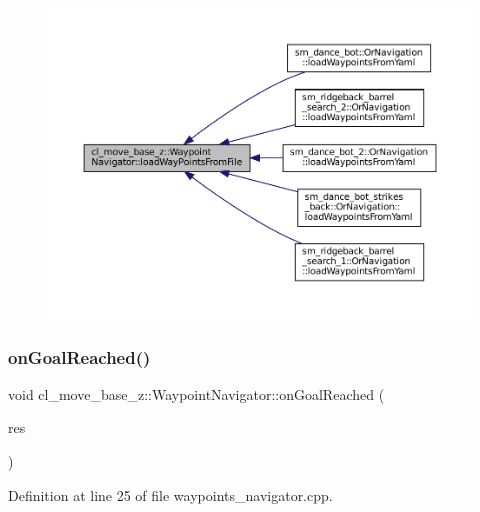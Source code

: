 \begin{figure}[H]
\begin{center}
\leavevmode
\includegraphics[width=350pt]{classcl__move__base__z_1_1WaypointNavigator_a18d74467ddf0e637a8d5a6e1fa2e93db_icgraph}
\end{center}
\end{figure}
\mbox{\label{classcl__move__base__z_1_1WaypointNavigator_ae10ba80b7e46b62096cac96609f66893}} 
\subsubsection{\texorpdfstring{on\+Goal\+Reached()}{onGoalReached()}}
{\footnotesize\ttfamily void cl\+\_\+move\+\_\+base\+\_\+z\+::\+Waypoint\+Navigator\+::on\+Goal\+Reached (\begin{DoxyParamCaption}\item[{\hyperlink{classcl__move__base__z_1_1ClMoveBaseZ_a99373d0c15ae96684462d8677f5fd632}{Cl\+Move\+Base\+Z\+::\+Result\+Const\+Ptr} \&}]{res }\end{DoxyParamCaption})\hspace{0.3cm}{\ttfamily [private]}}



Definition at line 25 of file waypoints\+\_\+navigator.\+cpp.



